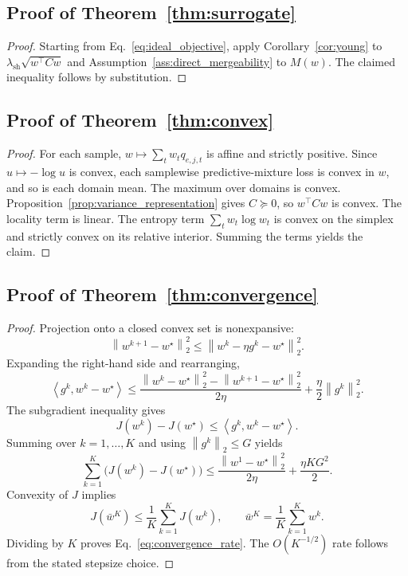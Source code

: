 \documentclass{article}
\theoremstyle{definition}
\newcommand{\norm}[1]{\left\lVert #1 \right\rVert}
\newcommand{\inner}[2]{\left\langle #1, #2 \right\rangle}
\begin{document}
\subsection{Proof of Theorem~\ref{thm:surrogate}}

\begin{proof}
Starting from Eq.~\eqref{eq:ideal_objective}, apply Corollary~\ref{cor:young} to \(\lambda_{\mathrm{sh}}\sqrt{w^\top Cw}\) and Assumption~\ref{ass:direct_mergeability} to \(M(w)\). The claimed inequality follows by substitution.
\end{proof}

\subsection{Proof of Theorem~\ref{thm:convex}}

\begin{proof}
For each sample, \(w\mapsto \sum_t w_t q_{e,j,t}\) is affine and strictly positive. Since \(u\mapsto -\log u\) is convex, each samplewise predictive-mixture loss is convex in \(w\), and so is each domain mean. The maximum over domains is convex. Proposition~\ref{prop:variance_representation} gives \(C\succeq 0\), so \(w^\top Cw\) is convex. The locality term is linear. The entropy term \(\sum_t w_t\log w_t\) is convex on the simplex and strictly convex on its relative interior. Summing the terms yields the claim.
\end{proof}

\subsection{Proof of Theorem~\ref{thm:convergence}}

\begin{proof}
Projection onto a closed convex set is nonexpansive:
\[
\norm{w^{k+1}-w^\star}_2^2
\le
\norm{w^k-\eta g^k-w^\star}_2^2.
\]
Expanding the right-hand side and rearranging,
\[
\inner{g^k}{w^k-w^\star}
\le
\frac{\norm{w^k-w^\star}_2^2-\norm{w^{k+1}-w^\star}_2^2}{2\eta}
+
\frac{\eta}{2}\norm{g^k}_2^2.
\]
The subgradient inequality gives
\[
J(w^k)-J(w^\star)\le \inner{g^k}{w^k-w^\star}.
\]
Summing over \(k=1,\dots,K\) and using \(\norm{g^k}_2\le G\) yields
\[
\sum_{k=1}^{K}\big(J(w^k)-J(w^\star)\big)
\le
\frac{\norm{w^1-w^\star}_2^2}{2\eta}
+
\frac{\eta K G^2}{2}.
\]
Convexity of \(J\) implies
\[
J(\bar w^K)\le \frac{1}{K}\sum_{k=1}^{K}J(w^k),
\qquad
\bar w^K=\frac{1}{K}\sum_{k=1}^{K}w^k.
\]
Dividing by \(K\) proves Eq.~\eqref{eq:convergence_rate}. The \(O(K^{-1/2})\) rate follows from the stated stepsize choice.
\end{proof}
\end{document}
